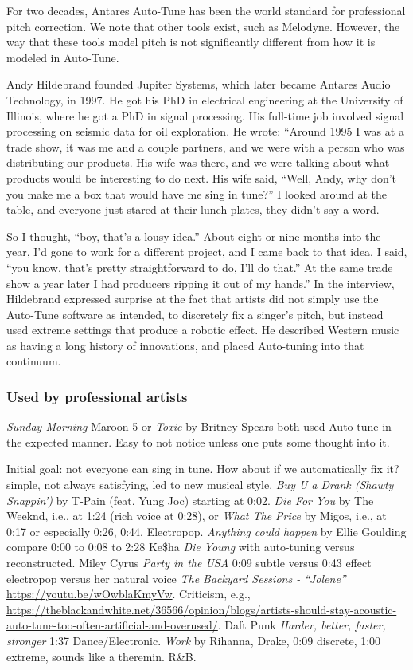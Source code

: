 For two decades, Antares Auto-Tune has been the world standard for professional pitch correction. We note that other tools exist, such as Melodyne. However, the way that these tools model pitch is not significantly different from how it is modeled in Auto-Tune. \cite{eckard2016}

Andy Hildebrand founded Jupiter Systems, which later became Antares Audio Technology, in 1997. He got his PhD in electrical engineering at the University of Illinois, where he got a PhD in signal processing. His full-time job involved signal processing on seismic data for oil exploration. He wrote: ``Around 1995 I was at a trade show, it was me and a couple partners, and we were with a person who was distributing our products. His wife was there, and we were talking about what products would be interesting to do next. His wife said, ``Well, Andy, why don't you make me a box that would have me sing in tune?'' I looked around at the table, and everyone just stared at their lunch plates, they didn't say a word.

So I thought, ``boy, that's a lousy idea.'' About eight or nine months into the year, I'd gone to work for a different project, and I came back to that idea, I said, ``you know, that's pretty straightforward to do, I'll do that.'' At the same trade show a year later I had producers ripping it out of my hands.'' In the interview, Hildebrand expressed surprise at the fact that artists did not simply use the Auto-Tune software as intended, to discretely fix a singer's pitch, but instead used extreme settings that produce a robotic effect. He described Western music as having a long history of innovations, and placed Auto-tuning into that continuum. 

\subsubsection{Used by professional artists}
\textit{Sunday Morning} Maroon 5 or \textit{Toxic} by Britney Spears both used Auto-tune in the expected manner. Easy to not notice unless one puts some thought into it. 

Initial goal: not everyone can sing in tune. How about if we automatically fix it? simple, not always satisfying, led to new musical style. \textit{Buy U a Drank (Shawty Snappin')} by T-Pain (feat. Yung Joc) starting at 0:02. \textit{Die For You} by The Weeknd, i.e., at 1:24 (rich voice at 0:28), or \textit{What The Price} by Migos, i.e., at 0:17 or especially 0:26, 0:44. Electropop. \textit{Anything could happen} by Ellie Goulding compare 0:00 to 0:08 to 2:28 Ke\$ha \textit{Die Young} with auto-tuning versus reconstructed. Miley Cyrus \textit{Party in the USA} 0:09 subtle versus 0:43 effect electropop versus her natural voice \textit{The Backyard Sessions - ``Jolene''} \url{https://youtu.be/wOwblaKmyVw}. Criticism, e.g., \url{https://theblackandwhite.net/36566/opinion/blogs/artists-should-stay-acoustic-auto-tune-too-often-artificial-and-overused/}. Daft Punk \textit{Harder, better, faster, stronger} 1:37 Dance/Electronic. \textit{Work} by Rihanna, Drake, 0:09 discrete, 1:00 extreme, sounds like a theremin. R\&B. 

